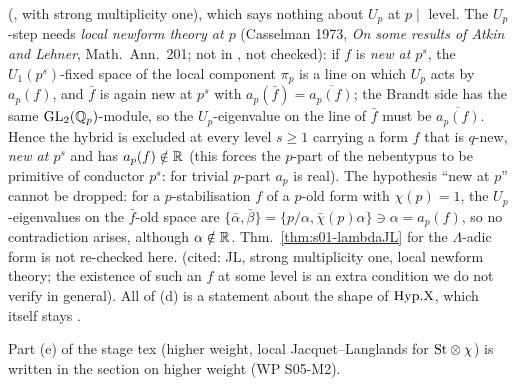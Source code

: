 \begin{proposition}[$\varepsilon=+1$; exponent $+1$]
\begin{enumerate}[label=(\alph*)]
  (, with strong multiplicity one), which says nothing about $U_p$ at $p\mid$ level. The $U_p$-step needs \emph{local newform theory at $p$}
  (Casselman 1973, \emph{On some results of Atkin and Lehner}, Math.\ Ann.\ 201; not in , not checked): if $f$ is \emph{new at $p^s$}, the $U_1(p^s)$-fixed space of the local component $\pi_p$ is a line on which $U_p$ acts by $a_p(f)$, and $\bar f$ is again new at $p^s$ with $a_p(\bar f)=\overline{a_p(f)}$; the Brandt side has the same $\mathrm{GL}_2(\mathbb{Q}_p)$-module, so the $U_p$-eigenvalue on the line of $\bar f$ must be $\overline{a_p(f)}$. Hence the hybrid is excluded at every level $s\ge1$ carrying a form $f$ that is $q$-new, \emph{new at $p^s$} and has $a_p(f)\notin\mathbb{R}$ (this forces the $p$-part of the nebentypus to be primitive of conductor $p^s$: for trivial $p$-part $a_p$ is real). The hypothesis ``new at $p$'' cannot be dropped: for a $p$-stabilisation $f$ of a $p$-old form with $\chi(p)=1$, the $U_p$-eigenvalues on the $\bar f$-old space are $\{\bar\alpha,\bar\beta\}=\{p/\alpha,\bar\chi(p)\alpha\}\ni\alpha=a_p(f)$, so no contradiction arises, although $\alpha\notin\mathbb{R}$. Thm.~\ref{thm:s01-lambdaJL} for the $\Lambda$-adic form is not re-checked here. \stpmc{} (cited: JL, strong multiplicity one, local newform theory; the existence of such an $f$ at some level is an extra condition we do not verify in general). All of (d) is a statement about the shape of
  $\mathrm{Hyp.X}$, which itself stays \sthyp.
\end{enumerate}
Part (e) of the stage tex (higher weight, local Jacquet--Langlands for $\mathrm{St}\otimes\chi$) is written in the section on higher weight
(WP S05-M2).
\end{proposition}
